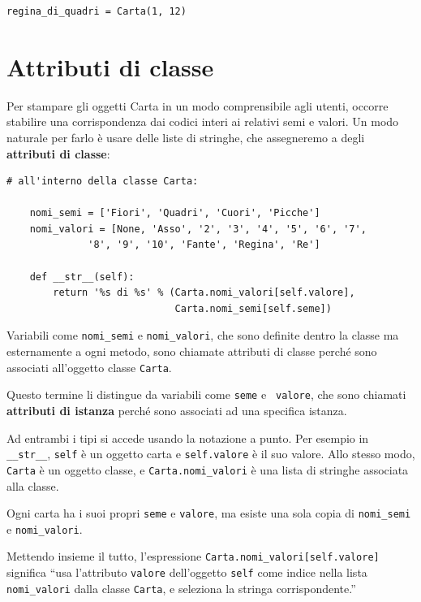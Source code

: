 \documentclass[10pt]{book}
\begin{document}
\begin{verbatim}
regina_di_quadri = Carta(1, 12)
\end{verbatim}
%


\section{Attributi di classe}
\label{class.attribute}

Per stampare gli oggetti Carta in un modo comprensibile agli utenti, occorre stabilire una corrispondenza dai codici interi ai relativi semi e valori. Un modo naturale per farlo è usare delle liste di stringhe, che assegneremo a degli {\bf attributi di classe}:

\begin{verbatim}
# all'interno della classe Carta:

    nomi_semi = ['Fiori', 'Quadri', 'Cuori', 'Picche']
    nomi_valori = [None, 'Asso', '2', '3', '4', '5', '6', '7', 
              '8', '9', '10', 'Fante', 'Regina', 'Re']

    def __str__(self):
        return '%s di %s' % (Carta.nomi_valori[self.valore],
                             Carta.nomi_semi[self.seme])
\end{verbatim}
%
Variabili come \verb"nomi_semi" e \verb"nomi_valori", che sono definite dentro la classe ma esternamente a ogni metodo, sono chiamate attributi di classe perché sono associati all'oggetto classe {\tt Carta}.

Questo termine li distingue da variabili come {\tt seme} e {\tt
  valore}, che sono chiamati {\bf attributi di istanza} perché sono associati ad una specifica istanza.

Ad entrambi i tipi si accede usando la notazione a punto. Per esempio in \verb"__str__", {\tt self} è un oggetto carta e {\tt self.valore} è il suo valore.  Allo stesso modo, {\tt Carta} è un oggetto classe, e \verb"Carta.nomi_valori" è una lista di stringhe associata alla classe.

Ogni carta ha i suoi propri {\tt seme} e {\tt valore}, ma esiste una sola copia di \verb"nomi_semi" e \verb"nomi_valori".

Mettendo insieme il tutto, l'espressione
\verb"Carta.nomi_valori[self.valore]" significa ``usa l'attributo {\tt valore} dell'oggetto {\tt self} come indice nella lista \verb"nomi_valori"
dalla classe {\tt Carta}, e seleziona la stringa corrispondente.''
\end{document}
